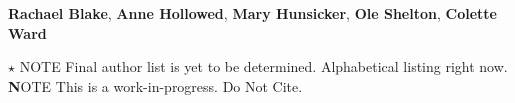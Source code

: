 \textbf{Rachael Blake}, 
\textbf{Anne Hollowed}, 
\textbf{Mary Hunsicker}, 
\textbf{Ole Shelton}, 
\textbf{Colette Ward}

$\star$ NOTE Final author list is yet to be determined. Alphabetical listing right now. 
\textbf NOTE This is a work-in-progress.  Do Not Cite.  
